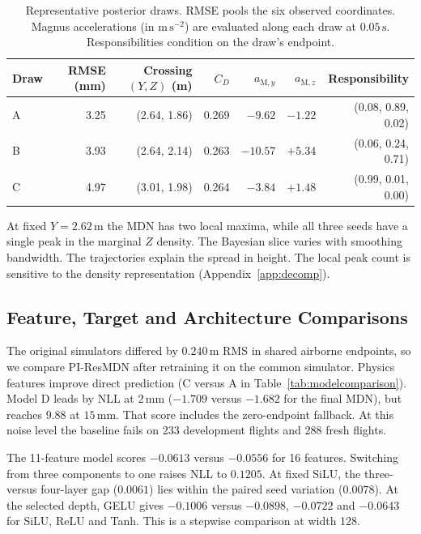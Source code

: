 \documentclass[11pt,a4paper]{article}
\begin{document}
\begin{table}[htbp]
  \centering
  \small
  \caption{Representative posterior draws. RMSE pools the six observed coordinates. Magnus accelerations (in $\mathrm{m\,s^{-2}}$) are evaluated along each draw at $0.05\,\mathrm{s}$. Responsibilities condition on the draw's endpoint.}
  \label{tab:traj}
  \begin{tabular}{lrrrrrr}
    \toprule
    Draw & RMSE (mm) & Crossing $(Y,Z)$ (m) & $C_D$ & $a_{\mathrm{M},y}$ & $a_{\mathrm{M},z}$ & Responsibility \\
    \midrule
    A & 3.25 & (2.64, 1.86) & 0.269 & $-9.62$ & $-1.22$ & (0.08, 0.89, 0.02) \\
    B & 3.93 & (2.64, 2.14) & 0.263 & $-10.57$ & $+5.34$ & (0.06, 0.24, 0.71) \\
    C & 4.97 & (3.01, 1.98) & 0.264 & $-3.84$ & $+1.48$ & (0.99, 0.01, 0.00) \\
    \bottomrule
  \end{tabular}
\end{table}

At fixed $Y=2.62\,\mathrm{m}$ the MDN has two local maxima, while all three seeds have a single peak in the marginal $Z$ density. The Bayesian slice varies with smoothing bandwidth. The trajectories explain the spread in height. The local peak count is sensitive to the density representation (Appendix~\ref{app:decomp}).

\subsection{Feature, Target and Architecture Comparisons}
\label{sec:comparisons}

The original simulators differed by $0.240\,\mathrm{m}$ RMS in shared airborne endpoints, so we compare PI-ResMDN after retraining it on the common simulator. Physics features improve direct prediction (C versus A in Table~\ref{tab:modelcomparison}). Model D leads by NLL at $2\,\mathrm{mm}$ ($-1.709$ versus $-1.682$ for the final MDN), but reaches $9.88$ at $15\,\mathrm{mm}$. That score includes the zero-endpoint fallback. At this noise level the baseline fails on 233 development flights and 288 fresh flights.

The 11-feature model scores $-0.0613$ versus $-0.0556$ for 16 features. Switching from three components to one raises NLL to $0.1205$. At fixed SiLU, the three- versus four-layer gap ($0.0061$) lies within the paired seed variation ($0.0078$). At the selected depth, GELU gives $-0.1006$ versus $-0.0898$, $-0.0722$ and $-0.0643$ for SiLU, ReLU and Tanh. This is a stepwise comparison at width 128.
\end{document}

